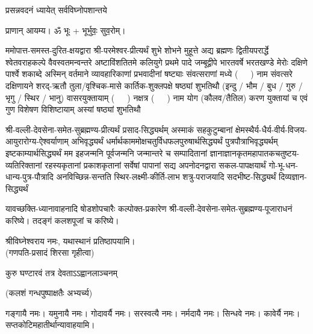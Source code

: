 
\setlength{\parindent}{0pt}




{प्रसन्नवदनं ध्यायेत् सर्वविघ्नोपशान्तये}

प्राणान् आयम्य। ॐ भूः + भूर्भुवः॒ सुव॒रोम्।



ममोपात्त-समस्त-दुरित-क्षयद्वारा श्री-परमेश्वर-प्रीत्यर्थं शुभे शोभने मुहूत्ते अद्य ब्रह्मणः
द्वितीयपरार्द्धे श्वेतवराहकल्पे वैवस्वतमन्वन्तरे अष्टाविंशतितमे कलियुगे प्रथमे पादे
जम्बूद्वीपे भारतवर्षे भरतखण्डे मेरोः दक्षिणे पार्श्वे शकाब्दे अस्मिन् वर्तमाने व्यावहारिकाणां प्रभवादीनां षष्ट्याः संवत्सराणां मध्ये \mbox{(~~~)} नाम संवत्सरे दक्षिणायने 
शरद्-ऋतौ  तुला/वृश्चिक-मासे कार्तिक-शुक्लपक्षे षष्ठ्यां शुभतिथौ
(इन्दु / भौम / बुध / गुरु / भृगु / स्थिर / भानु) वासरयुक्तायाम्
\mbox{(~~~)} नक्षत्र \mbox{(~~~)} नाम  योग  (कौलव/तैतिल) करण युक्तायां च एवं गुण विशेषण विशिष्टायाम् अस्यां षष्ठ्यां शुभतिथौ 

श्री-वल्ली-देवसेना-समेत-सुब्रह्मण्य-प्रीत्यर्थं प्रसाद-सिद्ध्यर्थम्
अस्माकं सहकुटुम्बानां क्षेमस्थैर्य-धैर्य-वीर्य-विजय-आयुरारोग्य-ऐश्वर्याणाम् अभिवृद्ध्यर्थं
धर्मार्थ\-काम\-मोक्ष\-चतुर्विध\-फल\-पुरुषार्थ\-सिद्ध्यर्थं पुत्र\-पौत्रा\-भि\-वृद्ध्यर्थम् इष्ट\-काम्यार्थ\-सिद्ध्यर्थं
मम इहजन्मनि पूर्वजन्मनि जन्मान्तरे च सम्पादितानां ज्ञानाज्ञानकृतमहा\-पातकचतुष्टय-व्यतिरिक्तानां रहस्यकृतानां प्रकाशकृतानां सर्वेषां पापानां सद्य अपनोदनद्वारा 
सकल-पाप\-क्षयार्थं गो-भू-धन-धान्य-पुत्र-पौत्रादि अनविच्छिन्न-सन्तति स्थिर-लक्ष्मी-कीर्ति-लाभ शत्रु-पराजयादि सदभीष्ट-सिद्ध्यर्थं दिव्यज्ञान-सिद्ध्यर्थं

यावच्छक्ति-ध्यानावाहनादि षोडशोपचारैः कल्पोक्त-प्रकारेण श्री-वल्ली-देवसेना-समेत-सुब्रह्मण्य-पूजाराधनं करिष्ये। तदङ्गं कलश\-पूजां च करिष्ये।


श्रीविघ्नेश्वराय नमः, यथास्थानं प्रतिष्ठापयामि।\\
(गणपति-प्रसादं शिरसा गृहीत्वा)


{कुरु घण्टारवं तत्र देवताऽऽह्वानलाञ्चनम्}


(कलशं गन्धपुष्पाक्षतैः अभ्यर्च्य)

गङ्गायै नमः। यमुनायै नमः। गोदावर्यै नमः। सरस्वत्यै नमः। नर्मदायै नमः। सिन्धवे नमः। कावेर्यै नमः।\\
सप्तकोटिमहातीर्थान्यावाहयामि। \\

